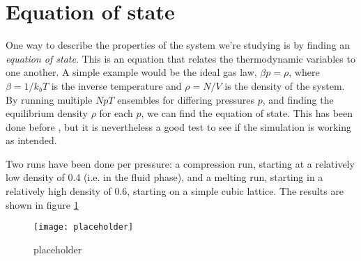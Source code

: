 \documentclass[thesis]{subfiles}
\begin{document}
\section{Equation of state}

One way to describe the properties of the system we're studying is by finding an \emph{equation of state}. This is an equation that relates the thermodynamic variables to one another. A simple example would be the ideal gas law, $\beta p = \rho$, where $\beta = 1/k_bT$ is the inverse temperature and $\rho = N/V$ is the density of the system. By running multiple $NpT$ ensembles for differing pressures $p$, and finding the equilibrium density $\rho$ for each $p$, we can find the equation of state. This has been done before \cite{van2017phase}, but it is nevertheless a good test to see if the simulation is working as intended. \bigbreak

Two runs have been done per pressure: a compression run, starting at a relatively low density of 0.4 (i.e. in the fluid phase), and a melting run, starting in a relatively high density of 0.6, starting on a simple cubic lattice. The results are shown in figure \ref{fig:eos}

\begin{figure}
	\centering
	\texttt{[image: placeholder]}
	\caption{placeholder}
	\label{fig:eos}
\end{figure}
\end{document}
